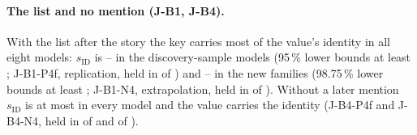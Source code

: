 \begin{table}[!ht]
\centering
\footnotesize
\caption{\textbf{Fresh stories, eight models.} 150 fresh cores per model; emitted-form score; 95\,\% two-stage cluster-bootstrap intervals (the N4 lines are decided on 98.75\,\% bounds, given in the text). Arms: AFTER = \fmtListA{}, POST = \fmtPost{}, POST-NULL = \fmtNull{}, PRE = \fmtSentB{}, BEFORE = \fmtBefore{}, NONE = \fmtNone{}. $r$: $\overline{\mathrm{ID}}_K$ in the arm divided by $\overline{\mathrm{ID}}_K$ under AFTER (1 by definition there); $s_{\mathrm{ID}}$: the key share of the value's identity; $\beta_K$, $\beta_V$: the share of generated answers that move to the clamped value under the key-only or value-only clamp, net of moves to it under the clamp to the other of S and X. The first four models are the discovery-sample models (P4), the next four the new families (N4).}
\label{tab:fresh}
{\scriptsize\setlength{\tabcolsep}{5pt}}
\end{table}

\paragraph{The list and no mention (J-B1, J-B4).} With the list after the story the key carries most of the value's identity in all eight models: $s_{\mathrm{ID}}$ is \JbRangeSidAfterPfourMin{}--\JbRangeSidAfterPfourMax{} in the discovery-sample models (95\,\% lower bounds at least \JbOneSidLbPfourMin{}; J-B1-P4f, replication, held in \JbOnePfMet{} of \JbOnePfEval{}) and \JbRangeSidAfterNfourMin{}--\JbRangeSidAfterNfourMax{} in the new families (98.75\,\% lower bounds at least \JbOneSidLbNfourMin{}; J-B1-N4, extrapolation, held in \JbOneNfMet{} of \JbOneNfEval{}). Without a later mention $s_{\mathrm{ID}}$ is at most \JbRangeSidNoneEightMax{} in every model and the value carries the identity (J-B4-P4f and J-B4-N4, held in \JbFourPfMet{} of \JbFourPfEval{} and \JbFourNfMet{} of \JbFourNfEval{}).

